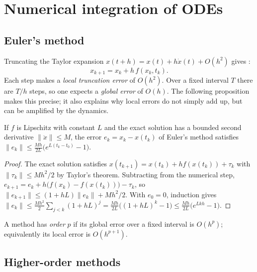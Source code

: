 \section{Numerical integration of ODEs}
\label{sec:numint}

\subsection{Euler's method}

Truncating the Taylor expansion $x(t + h) = x(t) + h\dot x(t) + O(h^2)$ gives :
\begin{equation}
  x_{k+1} = x_k + h\,f(x_k, t_k).
\end{equation}
Each step makes a \emph{local truncation error} of $O(h^2)$. Over a fixed interval $T$ there are $T/h$ steps, so one expects a
\emph{global error} of $O(h)$. The following proposition makes this precise; it also explains why local errors do not simply add up,
but can be amplified by the dynamics.

\begin{proposition}
If $f$ is Lipschitz with constant $L$ and the exact solution has a bounded second derivative $\|\ddot x\| \le M$, the error
$e_k = x_k - x(t_k)$ of Euler's method satisfies $\|e_k\| \le \frac{Mh}{2L}\big(e^{L(t_k - t_0)} - 1\big)$.
\end{proposition}
\begin{proof}
The exact solution satisfies $x(t_{k+1}) = x(t_k) + hf(x(t_k)) + \tau_k$ with $\|\tau_k\| \le Mh^2/2$ by Taylor's theorem. Subtracting from the
numerical step, $e_{k+1} = e_k + h\big(f(x_k) - f(x(t_k))\big) - \tau_k$, so $\|e_{k+1}\| \le (1 + hL)\|e_k\| + Mh^2/2$. With $e_0 = 0$, induction gives
$\|e_k\| \le \frac{Mh^2}{2}\sum_{j<k}(1 + hL)^j = \frac{Mh}{2L}\big((1 + hL)^k - 1\big) \le \frac{Mh}{2L}\big(e^{Lkh} - 1\big)$.
\end{proof}

\begin{definition}
A method has \emph{order} $p$ if its global error over a fixed interval is $O(h^p)$; equivalently its local error is $O(h^{p+1})$.
\end{definition}

\subsection{Higher-order methods}

